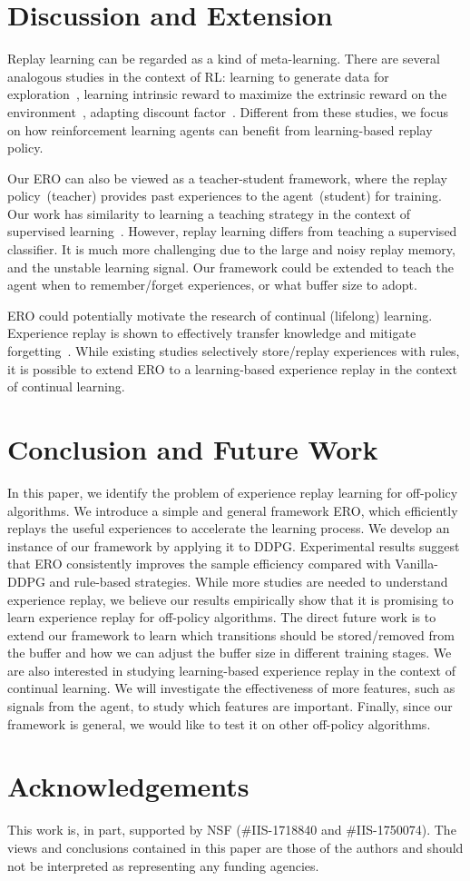 \documentclass{article}
\begin{document}
\section{Discussion and Extension}
Replay learning can be regarded as a kind of meta-learning. There are several analogous studies in the context of RL: learning to generate data for exploration~\cite{xu2018learning}, learning intrinsic reward to maximize the extrinsic reward on the environment~\cite{zheng2018learning}, adapting discount factor~\cite{xu2018meta}. Different from these studies, we focus on how reinforcement learning agents can benefit from learning-based replay policy.

Our ERO can also be viewed as a teacher-student framework, where the replay policy~(teacher) provides past experiences to the agent~(student) for training. Our work has similarity to learning a teaching strategy in the context of supervised learning~\cite{fan2018learning,wu2018learning}. However, replay learning differs from teaching a supervised classifier. It is much more challenging due to the large and noisy replay memory, and the unstable learning signal. Our framework could be extended to teach the agent when to remember/forget experiences, or what buffer size to adopt.

ERO could potentially motivate the research of continual (lifelong) learning. Experience replay is shown to effectively transfer knowledge and mitigate forgetting~\cite{yin2017knowledge,isele2018selective}. While existing studies selectively store/replay experiences with rules, it is possible to extend ERO to a learning-based experience replay in the context of continual learning.

\section{Conclusion and Future Work}
In this paper, we identify the problem of experience replay learning for off-policy algorithms. We introduce a simple and general framework ERO, which efficiently replays the useful experiences to accelerate the learning process. We develop an instance of our framework by applying it to DDPG. Experimental results suggest that ERO consistently improves the sample efficiency compared with Vanilla-DDPG and rule-based strategies. While more studies are needed to understand experience replay, we believe our results empirically show that it is promising to learn experience replay for off-policy algorithms. The direct future work is to extend our framework to learn which transitions should be stored/removed from the buffer and how we can adjust the buffer size in different training stages. We are also interested in studying learning-based experience replay in the context of continual learning. We will investigate the effectiveness of more features, such as signals from the agent, to study which features are important. Finally, since our framework is general, we would like to test it on other off-policy algorithms.

\section*{Acknowledgements}
This work is, in part, supported by NSF (\#IIS-1718840 and \#IIS-1750074). The views and conclusions contained in this paper are those of the authors and should not be interpreted as representing any funding agencies.



\end{document}
